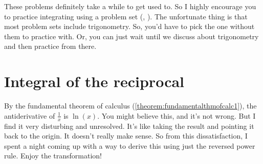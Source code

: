 These problems definitely take a while to get used to. So I highly encourage you to practice integrating using a problem set (\cite{alkousa-2023}, \cite{foster-no-date}). The unfortunate thing is that most problem sets include trigonometry. So, you'd have to pick the one without them to practice with. Or, you can just wait until we discuss about trigonometry and then practice from there.

\section{Integral of the reciprocal}
\label{sec:integralofthereciprocal}

By the fundamental theorem of calculus (\cref{theorem:fundamentalthmofcalc1}), the antiderivative of $\frac{1}{x}$ is $\ln(x)$. You might believe this, and it's not wrong. But I find it very disturbing and unresolved. It's like taking the result and pointing it back to the origin. It doesn't really make sense. So from this dissatisfaction, I spent a night coming up with a way to derive this using just the reversed power rule. Enjoy the transformation!

